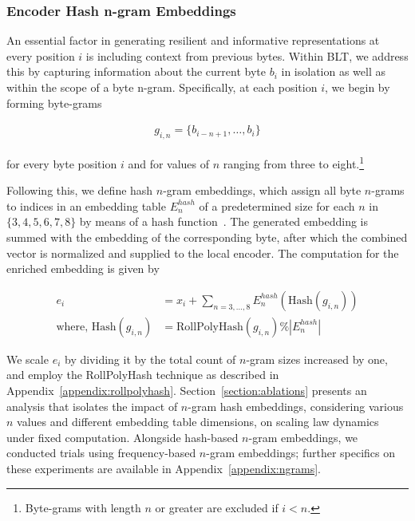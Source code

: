 \subsubsection{Encoder Hash n-gram Embeddings}
\label{sec:ngram-emb}
\label{sec:hash-emb}
An essential factor in generating resilient and informative representations at every position $i$ is including context from previous bytes. Within {\textsc BLT}, we address this by capturing information about the current byte $b_i$ in isolation as well as within the scope of a byte n-gram. Specifically, at each position $i$, we begin by forming byte-grams

\begin{align}
    g_{i,n}=\{b_{i-n + 1},\ldots, b_i\}
\end{align}

for every byte position $i$ and for values of $n$ ranging from three to eight.\footnote{
Byte-grams with length $n$ or greater are excluded if $i < n$. }

Following this, we define hash $n$-gram embeddings, which assign all byte $n$-grams to indices in an embedding table $E_{n}^{hash}$ of a predetermined size for each $n$ in $\{3,4,5,6,7,8\}$ by means of a hash function~\citep{bai2010learning}. The generated embedding is summed with the embedding of the corresponding byte, after which the combined vector is normalized and supplied to the local encoder. The computation for the enriched embedding is given by

\begin{align}
e_i &= x_i + \sum_{n = 3,...,8}E_{n}^{hash}(\text{Hash}(g_{i,n})) \\
\text{where, Hash}(g_{i,n}) &= \text{RollPolyHash}(g_{i,n}) \% |E_{n}^{hash}|
\end{align}

We scale $e_i$ by dividing it by the total count of $n$-gram sizes increased by one, and employ the RollPolyHash technique as described in Appendix~\ref{appendix:rollpolyhash}. Section~\ref{section:ablations} presents an analysis that isolates the impact of $n$-gram hash embeddings, considering various $n$ values and different embedding table dimensions, on scaling law dynamics under fixed computation. Alongside hash-based $n$-gram embeddings, we conducted trials using frequency-based $n$-gram embeddings; further specifics on these experiments are available in Appendix~\ref{appendix:ngrams}.

